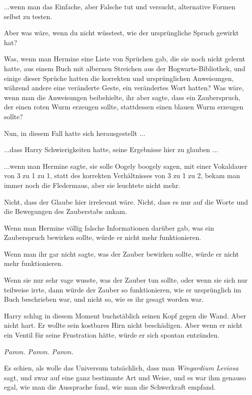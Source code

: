 ...wenn man das Einfache, aber Falsche tut und versucht, alternative Formen
selbst zu testen.

Aber was wäre, wenn du nicht wüsstest, wie der ursprüngliche Spruch gewirkt hat?

Was, wenn man Hermine eine Liste von Sprüchen gab, die sie noch nicht gelernt
hatte, aus einem Buch mit albernen Streichen aus der Hogwarts-Bibliothek, und
einige dieser Sprüche hatten die korrekten und ursprünglichen Anweisungen,
während andere eine veränderte Geste, ein verändertes Wort hatten? Was wäre,
wenn man die Anweisungen beibehielte, ihr aber sagte, dass ein Zauberspruch, der
einen roten Wurm erzeugen sollte, stattdessen einen blauen Wurm erzeugen sollte?

Nun, in diesem Fall hatte sich herausgestellt ...

...dass Harry Schwierigkeiten hatte, seine Ergebnisse hier zu glauben ...

...wenn man Hermine sagte, sie solle \glqq{}Oogely boogely\grqq{} sagen, mit
einer Vokaldauer von 3 zu 1 zu 1, statt des korrekten Verhältnisses von 3 zu 1
zu 2, bekam man immer noch die Fledermaus, aber sie leuchtete nicht mehr.

Nicht, dass der Glaube hier irrelevant wäre. Nicht, dass es nur auf die Worte
und die Bewegungen des Zauberstabs ankam.

Wenn man Hermine völlig falsche Informationen darüber gab, was ein Zauberspruch
bewirken sollte, würde er nicht mehr funktionieren.

Wenn man ihr gar nicht sagte, was der Zauber bewirken sollte, würde er nicht
mehr funktionieren.

Wenn sie nur sehr vage wusste, was der Zauber tun sollte, oder wenn sie sich nur
teilweise irrte, dann würde der Zauber so funktionieren, wie er ursprünglich im
Buch beschrieben war, und nicht so, wie es ihr gesagt worden war.

Harry schlug in diesem Moment buchstäblich seinen Kopf gegen die Wand. Aber
nicht hart. Er wollte sein kostbares Hirn nicht beschädigen. Aber wenn er nicht
ein Ventil für seine Frustration hätte, würde er sich spontan entzünden.

\emph{Pamm. Pamm. Pamm.}

Es schien, als wolle das Universum tatsächlich, dass man \glqq{}\emph{Wingardium
Leviosa\grqq{}} sagt, und zwar auf eine ganz bestimmte Art und Weise, und es war
ihm genauso egal, wie man die Aussprache fand, wie man die Schwerkraft empfand.

